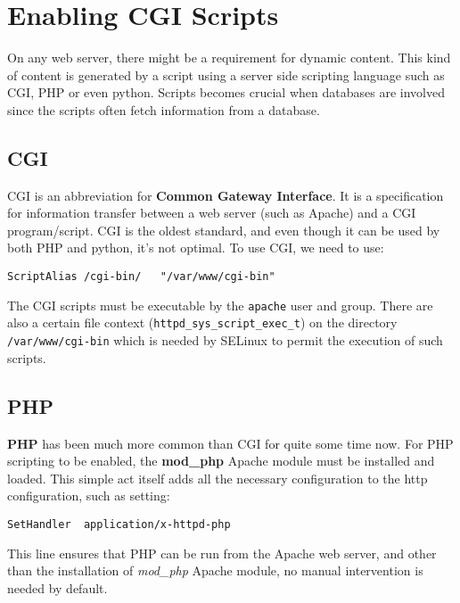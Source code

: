 	\section{Enabling CGI Scripts}
On any web server, there might be a requirement for dynamic content. This kind of content is generated by a script using a server side scripting language such as CGI, PHP or even python. Scripts becomes crucial when databases are involved since the scripts often fetch information from a database. 

\subsection{CGI}
CGI is an abbreviation for \textbf{Common Gateway Interface}. It is a specification for information transfer between a web server (such as Apache) and a CGI program/script. CGI is the oldest standard, and even though it can be used by both PHP and python, it's not optimal. To use CGI, we need to use:

\vspace{-15pt}
\begin{verbatim}
ScriptAlias	/cgi-bin/	"/var/www/cgi-bin"
\end{verbatim}
\vspace{-10pt}	

\noindent
The CGI scripts must be executable by the \verb|apache| user and group. There are also a certain file context (\verb|httpd_sys_script_exec_t|) on the directory \verb|/var/www/cgi-bin| which is needed by SELinux to permit the execution of such scripts. 

\subsection{PHP}
\textbf{PHP} has been much more common than CGI for quite some time now. For PHP scripting to be enabled, the \textbf{mod\_php} Apache module must be installed and loaded. This simple act itself adds all the necessary configuration to the http configuration, such as setting:

\vspace{-15pt}
\begin{verbatim}
SetHandler	application/x-httpd-php
\end{verbatim}
\vspace{-10pt}	

\noindent
This line ensures that PHP can be run from the Apache web server, and other than the installation of \textit{mod\_php} Apache module, no manual intervention is needed by default. 

